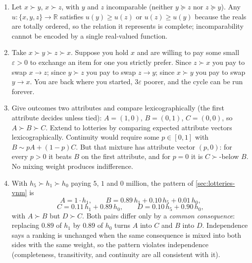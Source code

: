 \documentclass[11pt]{article}
\newcommand{\R}{\mathbb{R}}
\newcommand{\pref}{\succcurlyeq}
\newcommand{\strictpref}{\succ}
\newcommand{\indiff}{\sim}
\begin{document}
\begin{solution}
\begin{enumerate}[label=(\alph*)]
\item Let $x\strictpref y$, $x\strictpref z$, with $y$ and $z$ incomparable
(neither $y\pref z$ nor $z\pref y$). Any $u\colon\{x,y,z\}\to\R$ satisfies
$u(y)\geq u(z)$ or $u(z)\geq u(y)$ because the reals are totally ordered, so
the relation it represents is complete; incomparability cannot be encoded by
a single real-valued function.
\item Take $x\strictpref y\strictpref z\strictpref x$. Suppose you hold $x$
and are willing to pay some small $\varepsilon>0$ to exchange an item for one
you strictly prefer. Since $z\strictpref x$ you pay to swap $x\to z$; since
$y\strictpref z$ you pay to swap $z\to y$; since $x\strictpref y$ you pay to
swap $y\to x$. You are back where you started, $3\varepsilon$ poorer, and the
cycle can be run forever.
\item Give outcomes two attributes and compare lexicographically (the first
attribute decides unless tied): $A=(1,0)$, $B=(0,1)$, $C=(0,0)$, so
$A\strictpref B\strictpref C$. Extend to lotteries by comparing expected
attribute vectors lexicographically. Continuity would require some
$p\in[0,1]$ with $B\indiff pA+(1-p)C$. But that mixture has attribute vector
$(p,0)$: for every $p>0$ it beats $B$ on the first attribute, and for $p=0$
it is $C\strictpref$-below $B$. No mixing weight produces indifference.
\item With $h_5\strictpref h_1\strictpref h_0$ paying $5$, $1$ and $0$
million, the pattern of \cref{sec:lotteries-vnm} is
\[
A = 1\cdot h_1,
\qquad
B = 0.89\,h_1+0.10\,h_5+0.01\,h_0,
\]
\[
C = 0.11\,h_1+0.89\,h_0,
\qquad
D = 0.10\,h_5+0.90\,h_0,
\]
with $A\strictpref B$ but $D\strictpref C$. Both pairs differ only by a
\emph{common consequence}: replacing $0.89$ of $h_1$ by $0.89$ of $h_0$
turns $A$ into $C$ and $B$ into $D$.
Independence says a ranking is unchanged when the same consequence is mixed
into both sides with the same weight, so the pattern violates independence
(completeness, transitivity, and continuity are all consistent with it).
\end{enumerate}
\end{solution}
\end{document}
